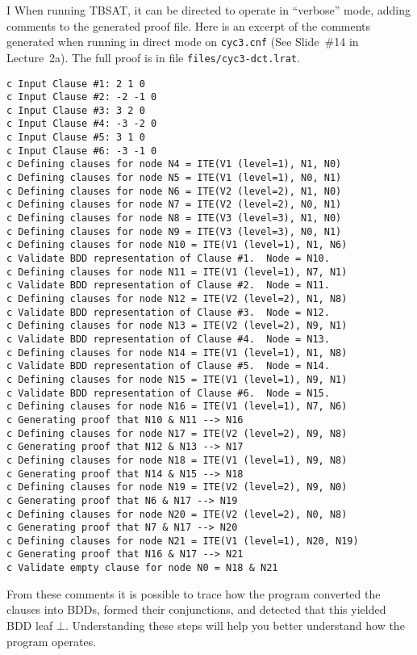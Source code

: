 \begin{problem}{I}
When running TBSAT, it can be directed to operate in ``verbose'' mode, adding comments to the generated proof file.
Here is an excerpt of the comments generated when running in direct mode on \texttt{cyc3.cnf} (See Slide~\#14 in Lecture~2a).
The full proof is in file \texttt{files/cyc3-dct.lrat}.
\begin{lstlisting}
c Input Clause #1: 2 1 0
c Input Clause #2: -2 -1 0
c Input Clause #3: 3 2 0
c Input Clause #4: -3 -2 0
c Input Clause #5: 3 1 0
c Input Clause #6: -3 -1 0
c Defining clauses for node N4 = ITE(V1 (level=1), N1, N0)
c Defining clauses for node N5 = ITE(V1 (level=1), N0, N1)
c Defining clauses for node N6 = ITE(V2 (level=2), N1, N0)
c Defining clauses for node N7 = ITE(V2 (level=2), N0, N1)
c Defining clauses for node N8 = ITE(V3 (level=3), N1, N0)
c Defining clauses for node N9 = ITE(V3 (level=3), N0, N1)
c Defining clauses for node N10 = ITE(V1 (level=1), N1, N6)
c Validate BDD representation of Clause #1.  Node = N10.
c Defining clauses for node N11 = ITE(V1 (level=1), N7, N1)
c Validate BDD representation of Clause #2.  Node = N11.
c Defining clauses for node N12 = ITE(V2 (level=2), N1, N8)
c Validate BDD representation of Clause #3.  Node = N12.
c Defining clauses for node N13 = ITE(V2 (level=2), N9, N1)
c Validate BDD representation of Clause #4.  Node = N13.
c Defining clauses for node N14 = ITE(V1 (level=1), N1, N8)
c Validate BDD representation of Clause #5.  Node = N14.
c Defining clauses for node N15 = ITE(V1 (level=1), N9, N1)
c Validate BDD representation of Clause #6.  Node = N15.
c Defining clauses for node N16 = ITE(V1 (level=1), N7, N6)
c Generating proof that N10 & N11 --> N16
c Defining clauses for node N17 = ITE(V2 (level=2), N9, N8)
c Generating proof that N12 & N13 --> N17
c Defining clauses for node N18 = ITE(V1 (level=1), N9, N8)
c Generating proof that N14 & N15 --> N18
c Defining clauses for node N19 = ITE(V2 (level=2), N9, N0)
c Generating proof that N6 & N17 --> N19
c Defining clauses for node N20 = ITE(V2 (level=2), N0, N8)
c Generating proof that N7 & N17 --> N20
c Defining clauses for node N21 = ITE(V1 (level=1), N20, N19)
c Generating proof that N16 & N17 --> N21
c Validate empty clause for node N0 = N18 & N21
\end{lstlisting}

From these comments it is possible to trace how the program converted
the clauses into BDDs, formed their conjunctions, and detected that
this yielded BDD leaf $\bot$.  Understanding these steps will help you
better understand how the program operates.


\end{problem}
